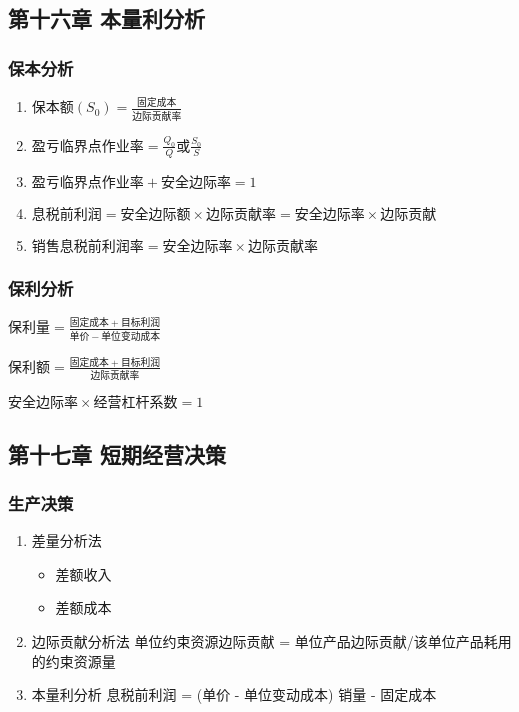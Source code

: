 \documentclass[12pt,a4paper]{article}
\begin{document}
\subsection{第十六章 本量利分析}
\label{sec:orgf54e58e}
\subsubsection{保本分析}
\label{sec:orgf7be92f}
\begin{enumerate}
\item \(保本额(S_{0})=\frac{固定成本}{边际贡献率}\)
\item \(盈亏临界点作业率 = \frac{Q_0}{Q}或\frac{S_0}{S}\)
\item \(盈亏临界点作业率 + 安全边际率 = 1\)
\item \(息税前利润 = 安全边际额 \times 边际贡献率 = 安全边际率 \times 边际贡献\)
\item \(销售息税前利润率 = 安全边际率 \times 边际贡献率\)
\end{enumerate}
\subsubsection{保利分析}
\label{sec:org5e52f7d}
\(保利量 = \frac{固定成本+目标利润}{单价 - 单位变动成本}\)

\(保利额 = \frac{固定成本+目标利润}{边际贡献率}\)

\(安全边际率\times 经营杠杆系数 =1\)
\subsection{第十七章 短期经营决策}
\label{sec:orge5e96fc}
\subsubsection{生产决策}
\label{sec:orgbce72cc}
\begin{enumerate}
\item 差量分析法
\label{sec:org1dec74d}
\begin{itemize}
\item 差额收入
\item 差额成本
\end{itemize}
\item 边际贡献分析法
\label{sec:org2dcfc68}
单位约束资源边际贡献 = 单位产品边际贡献/该单位产品耗用的约束资源量
\item 本量利分析
\label{sec:org0aff18d}
息税前利润 = (单价 - 单位变动成本) \texttimes{} 销量 - 固定成本
\end{enumerate}
\end{document}
